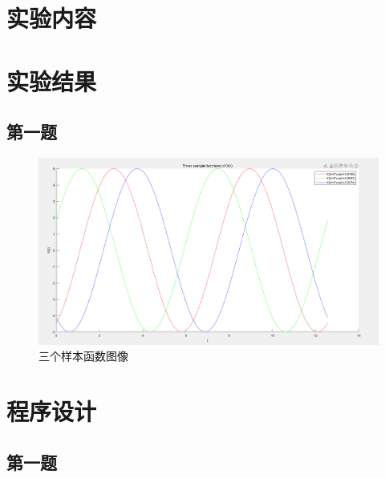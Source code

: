 \section{实验内容}
\zhlipsum[1]
\section{实验结果}
\subsection{第一题}
\zhlipsum[2]
\begin{figure}[!h]
	\centering 
	\includegraphics[width=1.10\textwidth]{figure/TreeFunctions.png}
	\caption{三个样本函数图像}
\end{figure}

\newpage
\section{程序设计}
\subsection{第一题}
\begin{code}
	
\end{code}
